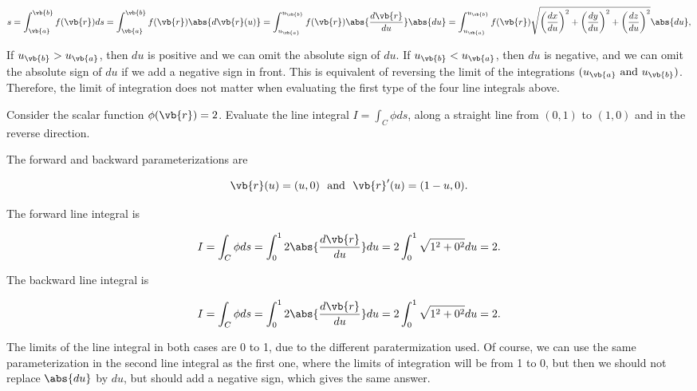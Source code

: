 \documentclass[english,a4paper,12pt]{report}
\begin{document}
\begin{equation}
	s = \int_{\vb{a} }^{\vb{b} }f(\vb{r} )ds = \int_{\vb{a} }^{\vb{b} } f(\vb{r} )\abs{d \vb{r} (u)} = \int_{u_{\vb{a} } }^{u_{\vb{b} }  } f(\vb{r} )\abs{\frac{d\vb{r} }{du} } \abs{du}  = \int_{u_{ \vb{a}} }^{u_{ \vb{b}} }f(\vb{r} ) \sqrt{\left( \frac{dx}{du}\right)^2 + \left( \frac{dy}{du}  \right)^2 + \left( \frac{dz}{du}  \right)^2} \abs{du},
\end{equation}

If \(u_{\vb{b} } > u_{\vb{a} }  \), then \(du\) is positive and we can omit the absolute sign of \(du\). If \(u_{\vb{b} } < u_{\vb{a} }  \), then \(du\) is negative, and we can omit the absolute sign of \(du\) if we add a negative sign in front. This is equivalent of reversing the limit of the integrations \((u_{\vb{a} } \text { and } u_{\vb{b} }  )\). Therefore, the limit of integration does not matter when evaluating the first type of the four line integrals above. 

{Consider the scalar function \(\phi (\vb{r} ) = 2\). Evaluate the line integral \(I = \int_{C}^{} \phi ds \), along a straight line from \((0,1)\) to \((1,0)\) and in the reverse direction.}
{The forward and backward parameterizations are

\begin{equation}
	\vb{r} (u) = (u,0) ~\text { and }~ \vb{r}' (u) = (1-u,0).
\end{equation}

The forward line integral is 

\begin{equation}
	I = \int_{C}^{} \phi ds = \int_{0}^{1} 2 \abs{\frac{d\vb{r} }{du} } du = 2 \int_{0}^{1} \sqrt{1^2 + 0^2} du = 2.     
\end{equation}

The backward line integral is 

\begin{equation}
	I = \int_{C}^{} \phi ds = \int_{0}^{1} 2 \abs{\frac{d\vb{r} }{du} } du = 2 \int_{0}^{1} \sqrt{1^2 + 0^2} du = 2.     
\end{equation}

The limits of the line integral in both cases are 0 to 1, due to the different paratermization used. Of course, we can use the same parameterization in the second line integral as the first one, where the limits of integration will be from 1 to 0, but then we should not replace \(\abs{du} \) by \(du\), but should add a negative sign, which gives the same answer.  
} 
\end{document}
